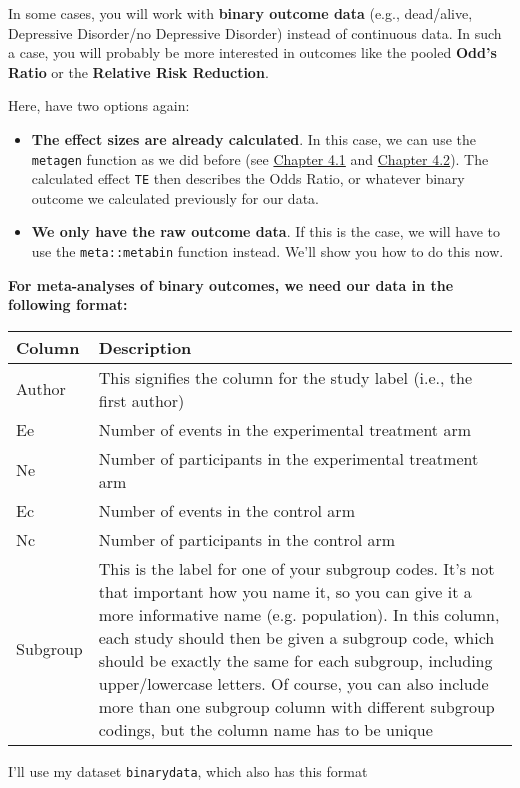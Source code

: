 \documentclass[]{book}
\providecommand{\tightlist}{%
  \setlength{\itemsep}{0pt}\setlength{\parskip}{0pt}}
\theoremstyle{definition}
\theoremstyle{definition}
\theoremstyle{definition}
\theoremstyle{remark}
\begin{document}
In some cases, you will work with \textbf{binary outcome data} (e.g.,
dead/alive, Depressive Disorder/no Depressive Disorder) instead of
continuous data. In such a case, you will probably be more interested in
outcomes like the pooled \textbf{Odd's Ratio} or the \textbf{Relative
Risk Reduction}.

Here, have two options again:

\begin{itemize}
\tightlist
\item
  \textbf{The effect sizes are already calculated}. In this case, we can
  use the \texttt{metagen} function as we did before (see
  \protect\hyperlink{fixed}{Chapter 4.1} and
  \protect\hyperlink{random}{Chapter 4.2}). The calculated effect
  \texttt{TE} then describes the Odds Ratio, or whatever binary outcome
  we calculated previously for our data.
\item
  \textbf{We only have the raw outcome data}. If this is the case, we
  will have to use the \texttt{meta::metabin} function instead. We'll
  show you how to do this now.
\end{itemize}

\textbf{For meta-analyses of binary outcomes, we need our data in the
following format:}

\begin{tabular}{l|l}
\hline
Column & Description\\
\hline
Author & This signifies the column for the study label (i.e., the first author)\\
\hline
Ee & Number of events in the experimental treatment arm\\
\hline
Ne & Number of participants in the experimental treatment arm\\
\hline
Ec & Number of events in the control arm\\
\hline
Nc & Number of participants in the control arm\\
\hline
Subgroup & This is the label for one of your subgroup codes. It's not that important how you name it, so you can give it a more informative name (e.g. population). In this column, each study should then be given a subgroup code, which should be exactly the same for each subgroup, including upper/lowercase letters. Of course, you can also include more than one subgroup column with different subgroup codings, but the column name has to be unique\\
\hline
\end{tabular}

I'll use my dataset \texttt{binarydata}, which also has this format
\end{document}
